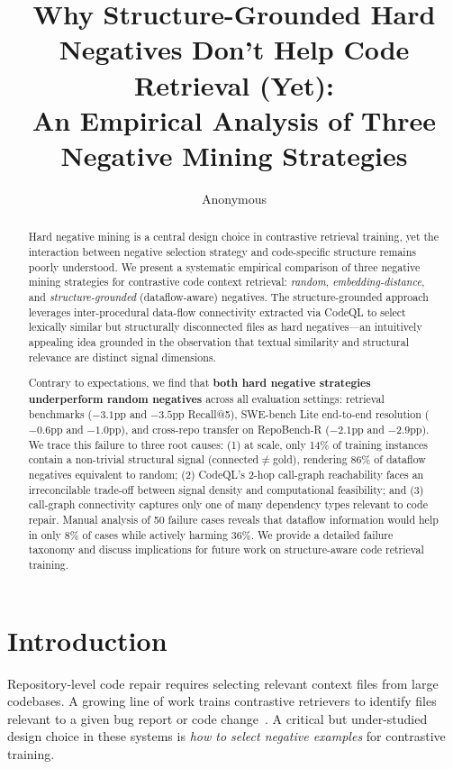 \documentclass[11pt]{article}
\title{Why Structure-Grounded Hard Negatives Don't Help Code Retrieval (Yet):\\An Empirical Analysis of Three Negative Mining Strategies}
\author{Anonymous}
\date{}
\begin{document}
\maketitle

\begin{abstract}
Hard negative mining is a central design choice in contrastive retrieval training, yet the interaction between negative selection strategy and code-specific structure remains poorly understood. We present a systematic empirical comparison of three negative mining strategies for contrastive code context retrieval: \emph{random}, \emph{embedding-distance}, and \emph{structure-grounded} (dataflow-aware) negatives. The structure-grounded approach leverages inter-procedural data-flow connectivity extracted via CodeQL to select lexically similar but structurally disconnected files as hard negatives---an intuitively appealing idea grounded in the observation that textual similarity and structural relevance are distinct signal dimensions.

Contrary to expectations, we find that \textbf{both hard negative strategies underperform random negatives} across all evaluation settings: retrieval benchmarks ($-3.1$pp and $-3.5$pp Recall@5), SWE-bench Lite end-to-end resolution ($-0.6$pp and $-1.0$pp), and cross-repo transfer on RepoBench-R ($-2.1$pp and $-2.9$pp). We trace this failure to three root causes: (1) at scale, only 14\% of training instances contain a non-trivial structural signal (connected$\neq$gold), rendering 86\% of dataflow negatives equivalent to random; (2) CodeQL's 2-hop call-graph reachability faces an irreconcilable trade-off between signal density and computational feasibility; and (3) call-graph connectivity captures only one of many dependency types relevant to code repair. Manual analysis of 50 failure cases reveals that dataflow information would help in only 8\% of cases while actively harming 36\%. We provide a detailed failure taxonomy and discuss implications for future work on structure-aware code retrieval training.
\end{abstract}

\section{Introduction}
\label{sec:intro}

Repository-level code repair requires selecting relevant context files from large codebases. A growing line of work trains contrastive retrievers to identify files relevant to a given bug report or code change~\citep{jimenez2024swebench}. A critical but under-studied design choice in these systems is \emph{how to select negative examples} for contrastive training.
\end{document}
